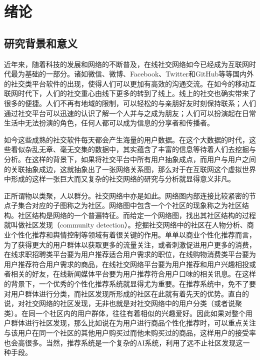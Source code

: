 \chapter{绪论}
\label{chap:intro}
\section{研究背景和意义}

近年来，随着科技的发展和网络的不断普及，在线社交网络如今已经成为互联网时代最为基础的一部分。诸如微信、微博、Facebook、Twitter和GitHub等等国内外的社交类平台软件的出现，使得人们可以更加有高效的沟通交流。在如今的移动互联网时代下，人们的社交重心由线下更多的转到了线上。线上的社交也确实带来了很多的便捷。人们不再有地域的限制，可以轻松的与亲朋好友时刻保持联系；人们通过社交平台可以迅速的认识了解一个人并与之成为朋友；人们可以扮演起在日常生活中无法扮演的角色，任何人都可以成为信息的分享者和传播者。

如今这些成熟的社交软件每天都会产生海量的用户数据。在这个大数据的时代，这些看似杂乱无章、毫无交集的数据中，其实蕴含了丰富的信息等待着人们去挖掘与分析。在这样的背景下，如果将社交平台中所有用户抽象成点，而用户与用户之间的关联抽象成边，这就抽象出了一张网络关系图，那么对于在互联网这个虚拟世界中形成的这样一张巨大而又复杂的社交网络的研究与分析就显得意义非凡。

正所谓物以类聚，人以群分。社交网络中亦是如此。网络图内部连接比较紧密的节点子集合对应的子图称之为社区。网络图中包含一个个社区的现象称之为社区结构。社区结构是网络的一个普遍特征。而给定一个网络图，找出其社区结构的过程就叫做社区发现（community detection）。挖掘社交网络中的社区在人物分析、商业个性化推荐和舆情控制等领域有着很关键的作用。单单以商业个性化推荐而言，为了获得更大的用户群体以获取更多的流量关注，或者刺激促进用户更多的消费，在线求职招聘类平台要为用户推荐适合用户需求的职位，在线购物消费类平台要为用户推荐符合用户需求的商品，在线社交网络平台要为用户推荐和用户兴趣相投或者相关的好友，在线新闻媒体平台要为用户推荐符合用户口味的相关讯息。在这样的背景下，一个优秀的个性化推荐系统就显得尤为重要。在推荐系统中，免不了要对用户群体进行分类，而社区发现所形成的社区在此就有着先天的优势。直白的说，对社交网络的社区发现，无非也就是对社交网络中的用户分类（或者说聚类）。在同一个社区内的用户群体，往往有着相似的兴趣爱好。因此如果对整个用户群体进行社区发现，那么比如说在为用户进行商品个性化推荐时，可以重点关注与该用户在同一个社区的其他用户购买过而他未购买过的商品，这样用户的接受率也会高很多。当然，推荐系统是一个复杂的AI系统，利用了远不止社区发现这一种手段。

